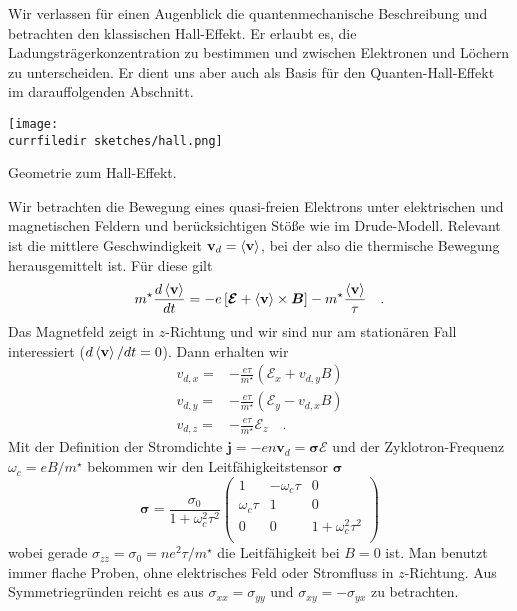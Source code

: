 Wir verlassen für einen Augenblick die quantenmechanische Beschreibung und betrachten den klassischen Hall-Effekt. Er erlaubt es, die Ladungsträgerkonzentration zu bestimmen und zwischen Elektronen und Löchern zu unterscheiden. Er dient uns aber auch als Basis für den Quanten-Hall-Effekt im darauffolgenden Abschnitt.

\begin{marginfigure}
   \texttt{[image: \\currfiledir sketches/hall.png]}
   \caption{Geometrie zum Hall-Effekt.}
\end{marginfigure}

Wir betrachten die Bewegung eines quasi-freien Elektrons unter elektrischen und magnetischen Feldern und berücksichtigen Stöße wie im Drude-Modell. Relevant ist die mittlere Geschwindigkeit $\mathbf{v}_d = \braket{\mathbf{v}}$, bei der also die thermische Bewegung herausgemittelt ist. Für diese gilt
\begin{equation}
   m^\star \frac{d \braket{\mathbf{v} }} {dt} = 
   -e \left[ \bm{\mathcal{E}} + \braket{\mathbf{v}} \times \bm{B} \right] 
   - m^\star \frac{\braket{\mathbf{v}}}{\tau} \quad .
\end{equation}
Das Magnetfeld zeigt in $z$-Richtung und wir sind nur am stationären Fall interessiert ($d \braket{\mathbf{v} } / dt = 0$). Dann erhalten wir
\begin{eqnarray}
   v_{d,x} =& - \frac{e \tau}{m^\star} ( \mathcal{E}_x + v_{d,y} B ) \\
   v_{d,y} =& - \frac{e \tau}{m^\star} ( \mathcal{E}_y - v_{d,x} B ) \\
   v_{d,z} =& - \frac{e \tau}{m^\star} \mathcal{E}_z  \quad .
\end{eqnarray}
Mit der Definition der Stromdichte $\mathbf{j} = - e n \mathbf{v}_d = \mathbf{\sigma} \bm{\mathcal{E}}$ 
 und der Zyklotron-Frequenz $\omega_c = e B /m^\star$ 
 bekommen wir den Leitfähigkeitstensor $\mathbf{\sigma}$
\begin{equation}
   \mathbf{\sigma} = \frac{\sigma_0}{ 1+ \omega_c^2 \tau^2}
   \begin{pmatrix}
      1  & - \omega_c \tau & 0 \\
      \omega_c \tau & 1 & 0  \\
      0 & 0 & 1+ \omega_c^2 \tau^2 \\
   \end{pmatrix} \label{eq:4_sigma_tensor}
\end{equation}
wobei gerade $\sigma_{zz} = \sigma_0 = n e^2 \tau / m^\star $ die Leitfähigkeit bei $B=0$ ist. Man benutzt immer flache Proben, ohne elektrisches Feld oder Stromfluss in $z$-Richtung. Aus Symmetriegründen reicht es aus $\sigma_{xx} = \sigma_{yy}$ und $\sigma_{xy} = - \sigma_{yx}$ zu betrachten. 

